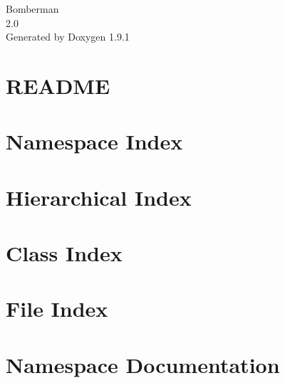 \let\mypdfximage\pdfximage\def\pdfximage{\immediate\mypdfximage}\documentclass[twoside]{book}
\newcommand{\+}{\discretionary{\mbox{\scriptsize$\hookleftarrow$}}{}{}}
\newcommand{\clearemptydoublepage}{%
  \newpage{\pagestyle{empty}\cleardoublepage}%
}
\begin{document}
\raggedbottom

\hypersetup{pageanchor=false,
             bookmarksnumbered=true,
             pdfencoding=unicode
            }
\begin{titlepage}
\vspace*{7cm}
\begin{center}%
{\Large Bomberman \\[1ex]\large 2.\+0 }\\
\vspace*{1cm}
{\large Generated by Doxygen 1.9.1}\\
\end{center}
\end{titlepage}
\clearemptydoublepage
{}
\tableofcontents
\clearemptydoublepage
{}
\hypersetup{pageanchor=true}

\chapter{README}
\label{md__documents__git_hub__b__y_e_p_400__l_y_n_4_1_indiestudio_lucas_guichard__r_e_a_d_m_e}

\chapter{Namespace Index}

\chapter{Hierarchical Index}

\chapter{Class Index}

\chapter{File Index}

\chapter{Namespace Documentation}




\end{document}
